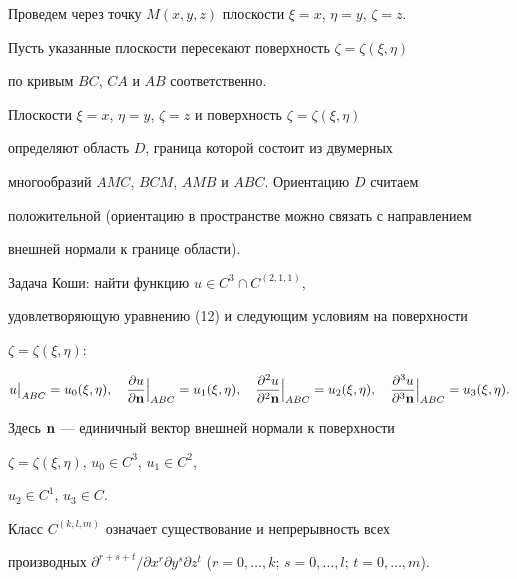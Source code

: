 Проведем через точку $M(x,y,z)$ плоскости $\xi=x$, $\eta=y$, $\zeta=z$.


Пусть указанные плоскости пересекают поверхность $\zeta=\zeta(\xi,\eta)$


по кривым $BC$, $CA$ и $AB$ соответственно.


Плоскости $\xi=x$, $\eta=y$, $\zeta=z$ и поверхность $\zeta=\zeta(\xi,\eta)$


определяют область $D$, граница которой состоит из двумерных


многообразий $AMC$, $BCM$, $AMB$ и $ABC$. Ориентацию $D$ считаем


положительной (ориентацию в пространстве можно связать с направлением


внешней нормали к границе области).





Задача Коши: найти функцию $u\in C^{3}\cap C^{(2,1,1)}$,


удовлетворяющую уравнению (12) и следующим условиям на поверхности


$\zeta=\zeta(\xi,\eta)$:


\begin{equation} %


u\big|_{ABC}=u_{0}(\xi,\eta),\quad


\frac{\partial u}{\partial\bold n}\Big|_{ABC}=u_{1}(\xi,\eta),


\quad


\frac{\partial^2 u}{\partial^2 \bold n}\Big|_{ABC}


=u_{2}(\xi,\eta),\quad


\frac{\partial^3 u}{\partial^3 \bold n}\Big|_{ABC}


=u_{3}(\xi,\eta).


\end{equation}


Здесь $\bold n$ --- единичный вектор внешней нормали к поверхности


$\zeta=\zeta(\xi,\eta)$, $u_{0}\in C^{3}$, $u_{1}\in C^{2}$,


$u_{2}\in C^{1}$, $u_{3}\in C$.


Класс $C^{(k,l,m)}$ означает существование и непрерывность всех


производных $\partial^{r+s+t}/\partial x^{r} \partial y^{s}


\partial z^{t}$ ($r=0,\dotsc,k$; $s=0,\dotsc,l$; $t=0,\dotsc,m$).





